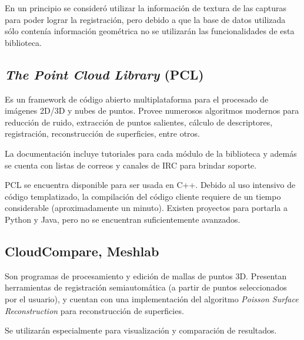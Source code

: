 	En un principio se consideró utilizar la información de textura de las
	capturas para poder lograr la registración, pero debido a que la base de
	datos utilizada sólo contenía información geométrica  no se utilizarán las
	funcionalidades de esta biblioteca.

	\subsection{\emph{The Point Cloud Library} (PCL)}
	Es un framework de código abierto multiplataforma para el procesado de
	imágenes 2D/3D y nubes de puntos.
	Provee numerosos algoritmos modernos para reducción de ruido, extracción de
	puntos salientes, cálculo de descriptores, registración, reconstrucción de
	superficies, entre otros.

	La documentación incluye tutoriales para cada módulo de la biblioteca y
	además se cuenta con listas de correos y canales de IRC para brindar
	soporte.

	PCL se encuentra disponible para ser usada en C++.
	Debido al uso intensivo de código templatizado, la compilación del
	código cliente requiere de un tiempo considerable (aproximadamente un minuto).
	Existen proyectos para portarla a Python y Java, pero no se encuentran
	suficientemente avanzados.

	\subsection{CloudCompare, Meshlab}
	Son programas de procesamiento y edición de mallas de puntos 3D.  Presentan
	herramientas de registración semiautomática (a partir de puntos
	seleccionados por el usuario), y cuentan con una implementación del
	algoritmo \emph{Poisson Surface Reconstruction} para reconstrucción de
	superficies.

	Se utilizarán especialmente para visualización y comparación de resultados.

